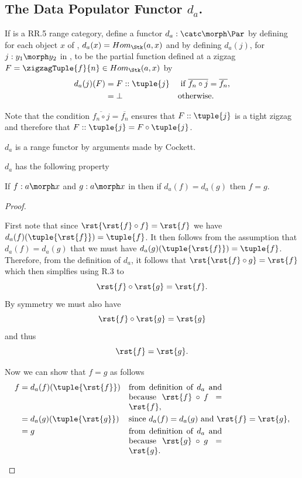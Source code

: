 
\subsection{The Data Populator Functor $d_a$.}
If \catcw is a RR.5 range category, define a functor $d_a: \catc \morph \Par$ by defining for each object $x$ of \catc, $d_a(x)=Hom_{\Stk}(a,x)$ and by defining $d_a(j)$, for $j:y_1 \morph y_2$ in \catc, to be the partial function  defined at a zigzag 
$F=\zigzagTuple{f}{n}\in Hom_{\Stk}(a,x)$ by
\begin{align*}
d_a(j)(F) &= F :: \tuple{j}  &&\mbox{ if $\overline{f_n \circ j} = \overline{f_n}$,} \\
             &=\bot        && \mbox{otherwise.}
\end{align*}

Note that the condition $\overline{f_n \circ j} = \overline{f_n}$ ensures
that $F :: \tuple{j}$ is a tight zigzag and therefore that
$F :: \tuple{j}= F \circ \tuple{j}$.

$d_a$ is a range functor by arguments made by Cockett. 

$d_a$ has the following property
\begin{lemma}
If $f: a \morph x$ and $g: a \morph x$ in \catcw then 
if $d_a(f)=d_a(g)$ then $f=g$.
\end{lemma}
\begin{proof}
\begin{newtt}
First note that since $\rst{\rst{f} \circ f} = \rst{f}$ 
we have $d_a(f)(\tuple{\rst{f}})= \tuple{f}$.
It then follows from the assumption that $d_a(f)=d_a(g)$
that we must have 
$d_a(g)(\tuple{\rst{f}})= \tuple{f}$. 
Therefore, from the definition of $d_a$, it follows that
$\rst{\rst{f} \circ g} = \rst{f}$
which then simplfies using R.3 to
\[
\rst{f} \circ \rst{g} = \rst{f}.
\]
By symmetry we must also have
\[
\rst{f} \circ \rst{g} = \rst{g}
\]
and thus
\[
\rst{f} = \rst{g}.
\]

Now we can show that $f=g$ as follows
\begin{align*}
f &= d_a(f)(\tuple{\rst{f}}) 
                     && \mbox{\parbox[t]{4cm}{from definition of $d_a$ 
                               and because $\rst{f} \circ f = \rst{f}$,}}\\
  &= d_a(g)(\tuple{\rst{g}}) 
                     && \mbox{since $d_a(f)=d_a(g)$ and $\rst{f}=\rst{g}$,}\\
  &= g               && \mbox{\parbox[t]{4cm}{from definition of $d_a$ 
                               and because $\rst{g} \circ g = \rst{g}$.}}
\end{align*}
\end{newtt}
\end{proof}

